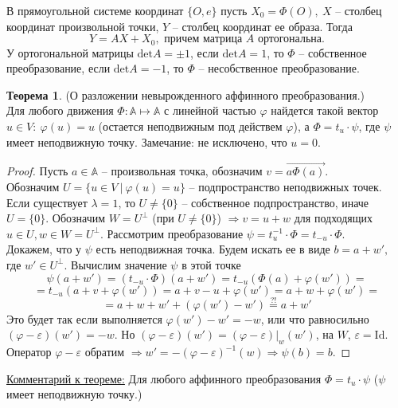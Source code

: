 \documentclass[a4paper, 12pt]{article}
\theoremstyle{definition}
\newtheorem*{theorem}{Теорема}
\begin{document}
    В прямоугольной системе координат $\{O,e\}$ пусть $X_0 = 
    \Phi(O),\ X$ -- столбец координат произвольной точки, 
    $Y$ -- столбец координат ее образа. Тогда 
    $$Y = AX + X_0, \text{ причем матрица $A$ ортогональна.}$$
    У ортогональной матрицы $\text{det}A = \pm 1$, если 
    $\text{det}A = 1$, то $\Phi$ -- собственное 
    преобразование, если $\text{det}A = -1$, то $\Phi$ --
    несобственное преобразование.  
    \begin{theorem}
        (О разложении невырожденного аффинного преобразования.)
        \\
        Для любого движения $\Phi:\mathbb{A} \longmapsto \mathbb
        {A}$ с линейной частью $\varphi$ найдется такой 
        вектор $u \in V:\ \varphi(u) = u$ (остается 
        неподвижным под действем $\varphi$), а $\Phi = 
        t_u\cdot \psi$, где $\psi$ имеет неподвижную точку.
        Замечание: не исключено, что $u = 0$.   
    \end{theorem}
    \begin{proof}
        Пусть $a \in \mathbb{A}$ -- произвольная точка, 
        обозначим $v = \overrightarrow{a \Phi(a)}$.\\
        Обозначим $U = \{u \in V\ |\ \varphi(u) = u\}$ --
        подпространство неподвижных точек.\\
        Если существует $\lambda = 1$, то $U \neq \{0\}$ --
        собственное подпространство, иначе $U = \{0\}$.
        Обозначим $W = U^\perp$ (при $U \neq \{0\}$) 
        $\Longrightarrow v = u + w$ для подходящих 
        $u \in U, w \in W = U^\perp$. Рассмотрим 
        преобразование $\psi = t_u^{-1}\cdot \Phi = 
        t_{-u}\cdot \Phi$.\\
        Докажем, что у $\psi$ есть неподвижная точка. Будем 
        искать ее в виде $b = a + w',$ где $w' \in U^\perp$.
        Вычислим значение $\psi$ в этой точке $$\psi(a + w')
        = (t_{-u}\cdot \Phi)(a + w') = t_{-u}(\Phi(a) + 
        \varphi(w')) = $$ $$= t_{-u}(a + v + \varphi(w')) = 
        a + v - u + \varphi(w') = a + w + \varphi(w') =$$
        $$= a + w + w' + (\varphi(w') - w') \overset{?!}{=}
        a + w'$$
        Это будет так если выполняется $\varphi(w') - w' = - 
        w$, или что равносильно\\ $(\varphi - \varepsilon)(w')
        = -w$. Но $(\varphi - \varepsilon)(w') = (\varphi - 
        \varepsilon)|_w(w')$, на $W$, $\varepsilon = \text{Id}
        $. Оператор $\varphi - \varepsilon$ обратим 
        $\Longrightarrow w' = -(\varphi - \varepsilon)^{-1}
        (w) \Longrightarrow \psi(b) = b$.    
    \end{proof}
    \underline{Комментарий к теореме:} Для любого аффинного 
    преобразования $\Phi = t_u\cdot \psi$ ($\psi$ имеет 
    неподвижную точку.)
\end{document}
